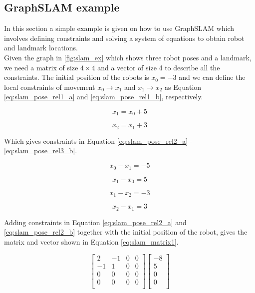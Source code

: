 \subsection{GraphSLAM example}

In this section a simple example is given on how to use GraphSLAM which involves defining constraints and solving a system of equations to obtain robot and landmark locations.\\

Given the graph in \autoref{fig:slam_ex} which shows three robot poses and a landmark, we need a matrix of size $4\times4$ and a vector of size 4 to describe all the constraints. The initial position of the robots is $x_0 = -3$ and we can define the local constraints of movement $x_0 \rightarrow x_1$ and $x_1 \rightarrow x_2$ as Equation \ref{eq:slam_pose_rel1_a} and \ref{eq:slam_pose_rel1_b}, respectively.

\begin{equation}
\label{eq:slam_pose_rel1_a}
x_1 = x_0 + 5
\end{equation}

\begin{equation}
\label{eq:slam_pose_rel1_b}
x_2 = x_1 + 3
\end{equation}

Which gives constraints in Equation \ref{eq:slam_pose_rel2_a} - \ref{eq:slam_pose_rel3_b}.

\begin{equation}
\label{eq:slam_pose_rel2_a}
x_0 - x_1 = -5
\end{equation}

\begin{equation}
\label{eq:slam_pose_rel2_b}
x_1 - x_0 = 5
\end{equation}

\begin{equation}
\label{eq:slam_pose_rel3_a}
x_1 - x_2 = -3
\end{equation}

\begin{equation}
\label{eq:slam_pose_rel3_b}
x_2 - x_1 = 3
\end{equation}

Adding constraints in Equation \ref{eq:slam_pose_rel2_a} and \ref{eq:slam_pose_rel2_b} together with the initial position of the robot, gives the matrix and vector shown in Equation \ref{eq:slam_matrix1}.

\begin{equation}
\label{eq:slam_matrix1}
\begin{bmatrix}
2 & -1 & 0 & 0 \\
-1 & 1 & 0 & 0 \\
0 & 0 & 0 & 0 \\
0 & 0 & 0 & 0 \\
\end{bmatrix}
\begin{bmatrix}
-8 \\
5 \\
0 \\
0 \\
\end{bmatrix}
\end{equation}

